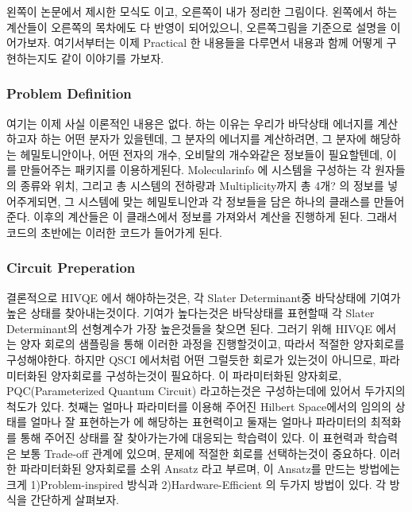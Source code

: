 \documentclass[11pt]{article}
\begin{document}
왼쪽이 논문에서 제시한 모식도 이고, 오른쪽이 내가 정리한 그림이다. 
왼쪽에서 하는 계산들이 오른쪽의 목차에도 다 반영이 되어있으니, 오른쪽그림을 기준으로 설명을 이어가보자. 
여기서부터는 이제 Practical 한 내용들을 다루면서 내용과 함께 어떻게 구현하는지도 같이 이야기를 가보자. 

\subsubsection{Problem Definition}
여기는 이제 사실 이론적인 내용은 없다. 
하는 이유는 우리가 바닥상태 에너지를 계산하고자 하는 어떤 분자가 있을텐데, 그 분자의 에너지를 계산하려면, 
그 분자에 해당하는 헤밀토니안이나, 어떤 전자의 개수, 오비탈의 개수와같은 정보들이 필요할텐데, 이를 만들어주는 패키지를 이용하게된다. 
Molecularinfo 에 시스템을 구성하는 각 원자들의 종류와 위치, 그리고 총 시스템의 전하량과 Multiplicity까지 총 4개? 의 정보를 넣어주게되면,
그 시스템에 맞는 헤밀토니안과 각 정보들을 담은 하나의 클래스를 만들어준다. 이후의 계산들은 이 클래스에서 정보를 가져와서 계산을 진행하게 된다. 
그래서 코드의 초반에는 이러한 코드가 들어가게 된다. 

\subsubsection{Circuit Preperation}
결론적으로 HIVQE 에서 해야하는것은, 각 Slater Determinant중 바닥상태에 기여가 높은 상태를 찾아내는것이다. 
기여가 높다는것은 바닥상태를 표현할때 각 Slater Determinant의 선형계수가 가장 높은것들을 찾으면 된다. 
그러기 위해 HIVQE 에서는 양자 회로의 샘플링을 통해 이러한 과정을 진행할것이고, 따라서 적절한 양자회로를 구성해야한다. 
하지만 QSCI 에서처럼 어떤 그럴듯한 회로가 있는것이 아니므로, 파라미터화된 양자회로를 구성하는것이 필요하다. 
이 파라미터화된 양자회로, PQC(Parameterized Quantum Circuit) 라고하는것은 구성하는데에 있어서 두가지의 척도가 있다. 
첫째는 얼마나 파라미터를 이용해 주어진 Hilbert Space에서의 임의의 상태를 얼마나 잘 표현하는가 에 해당하는 표현력이고
둘재는 얼마나 파라미터의 최적화를 통해 주어진 상태를 잘 찾아가는가에 대응되는 학습력이 있다. 
이 표현력과 학습력은 보통 Trade-off 관계에 있으며, 문제에 적절한 회로를 선택하는것이 중요하다. 
이러한 파라미터화된 양자회로를 소위 Ansatz 라고 부르며, 이 Ansatz를 만드는 방법에는 크게  1)Problem-inspired 방식과 2)Hardware-Efficient 의 두가지 방법이 있다. 
각 방식을 간단하게 살펴보자. 
\end{document}
